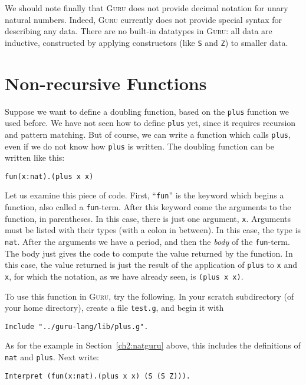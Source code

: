 \documentclass{book}[12pt]
\newcommand{\guru}[0]{\textsc{Guru}\xspace}
\begin{document}
We should note finally that \guru does not provide decimal notation
for unary natural numbers.  Indeed, \guru currently does not provide
special syntax for describing any data.  There are no built-in
datatypes in \guru: all data are inductive, constructed by applying
constructors (like \texttt{S} and \texttt{Z}) to smaller data.

\section{Non-recursive Functions}
\label{ch2:nonrec}

Suppose we want to define a doubling function, based on the
\texttt{plus} function we used before.  We have not seen how to define
\texttt{plus} yet, since it requires recursion and pattern matching.
But of course, we can write a function which calls \texttt{plus},
even if we do not know how \texttt{plus} is written.  The doubling
function can be written like this:

\begin{verbatim}
fun(x:nat).(plus x x)
\end{verbatim}

\noindent Let us examine this piece of code.  First, ``\texttt{fun}''
is the keyword which begins a function, also called a
\texttt{fun}-term.  After this keyword come the arguments to the
function, in parentheses.  In this case, there is just one argument,
\texttt{x}.  Arguments must be listed with their types (with a colon
in between).  In this case, the type is \texttt{nat}.  After the
arguments we have a period, and then the \emph{body} of the
\texttt{fun}-term.  The body just gives the code to compute the value
returned by the function.  In this case, the value returned is just
the result of the application of \texttt{plus} to \texttt{x} and
\texttt{x}, for which the notation, as we have already seen, is
\texttt{(plus x x)}.

To use this function in \guru, try the following.  In your scratch
subdirectory (of your home directory), create a file \texttt{test.g},
and begin it with

\begin{verbatim}
Include "../guru-lang/lib/plus.g".
\end{verbatim}

\noindent As for the example in Section~\ref{ch2:natguru} above,
this includes the definitions of \texttt{nat} and \texttt{plus}.
Next write:

\begin{verbatim}
Interpret (fun(x:nat).(plus x x) (S (S Z))).
\end{verbatim}
\end{document}
